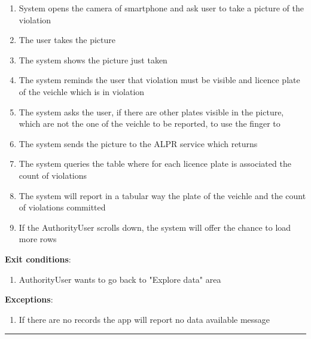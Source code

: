 \begin{enumerate}
\begin{itemize}
\begin{enumerate}
      \item{System opens the camera of smartphone and ask user to take a picture of the violation}
      \item{The user takes the picture }
      \item{The system shows the picture just taken }
      \item{The system reminds the user that violation must be visible and licence plate of the veichle which is in violation}
      \item{The system asks the user, if there are other plates visible in the picture, which are not the one of the veichle to be reported, to use the finger to }
      \item{The system sends the picture to the ALPR service which returns }
      \item{The system queries the table where for each licence plate is associated the count of violations }
      \item{The system will report in a tabular way the plate of the veichle and the count of violations committed}
      \item{If the AuthorityUser scrolls down, the system will offer the chance to load more rows}
    \end{enumerate}
    \textbf{Exit conditions}:
    \begin{enumerate}
      \item{AuthorityUser wants to go back to "Explore data" area}
    \end{enumerate}
    \textbf{Exceptions}:
    \begin{enumerate}
      \item{If there are no records the app will report no data available message}
    \end{enumerate}
    \rule{\linewidth}{0.4pt}


\end{itemize}
\end{enumerate}
